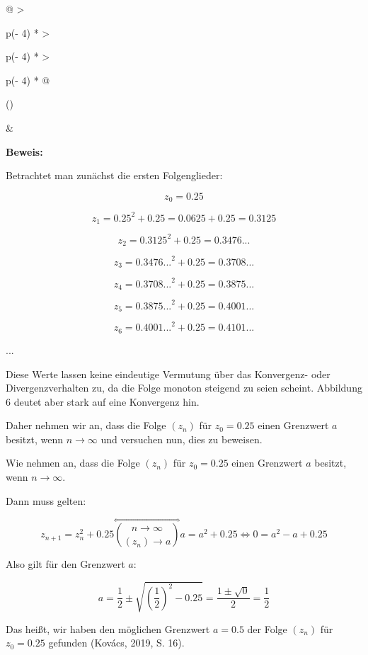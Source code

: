 \documentclass[a4paper, 12pt]{book}
\begin{document}
\begin{longtable}[]{@{}
  >{\raggedright\arraybackslash}p{(\columnwidth - 4\tabcolsep) * }
  >{\raggedright\arraybackslash}p{(\columnwidth - 4\tabcolsep) * }
  >{\raggedright\arraybackslash}p{(\columnwidth - 4\tabcolsep) * }@{}}
\toprule()
\begin{minipage}[b]{\linewidth}\raggedright
\end{minipage} & \begin{minipage}[b]{\linewidth}\raggedright
\textbf{Beweis:}

Betrachtet man zunächst die ersten Folgenglieder:

\[z_{0} = 0.25\]

\[z_{1} = {0.25}^{2} + 0.25 = 0.0625 + 0.25 = 0.3125\]

\[z_{2} = {0.3125}^{2} + 0.25 = 0.3476...\]

\[z_{3} = {0.3476...}^{2} + 0.25 = 0.3708...\]

\[z_{4} = {0.3708...}^{2} + 0.25 = 0.3875...\]

\[z_{5} = {0.3875...}^{2} + 0.25 = 0.4001...\]

\[z_{6} = {0.4001...}^{2} + 0.25 = 0.4101...\]

...

Diese Werte lassen keine eindeutige Vermutung über das Konvergenz- oder
Divergenzverhalten zu, da die Folge monoton steigend zu seien scheint.
Abbildung 6 deutet aber stark auf eine Konvergenz hin.

Daher nehmen wir an, dass die Folge \(\left( z_{n} \right)\) für
\(z_{0} = 0.25\) einen Grenzwert \(a\) besitzt, wenn
\(n \rightarrow \infty\) und versuchen nun, dies zu beweisen.

Wie nehmen an, dass die Folge \(\left( z_{n} \right)\) für
\(z_{0} = 0.25\) einen Grenzwert \(a\) besitzt, wenn
\(n \rightarrow \infty\).

Dann muss gelten:

\[z_{n + 1} = z_{n}^{2} + 0.25\overset{\Leftrightarrow}{\binom{n \rightarrow \infty}{\left( z_{n} \right) \rightarrow a}}a = a^{2} + 0.25 \Longleftrightarrow 0 = a^{2} - a + 0.25\]

Also gilt für den Grenzwert \(a\):

\[a = \frac{1}{2} \pm \sqrt{\left( \frac{1}{2} \right)^{2} - 0.25} = \frac{1 \pm \sqrt{0}}{2} = \frac{1}{2}\]

Das heißt, wir haben den möglichen Grenzwert \(a = 0.5\) der Folge
\(\left( z_{n} \right)\) für \(z_{0} = 0.25\) gefunden (Kovács,
2019, S. 16).


\end{minipage}
\end{longtable}
\end{document}
